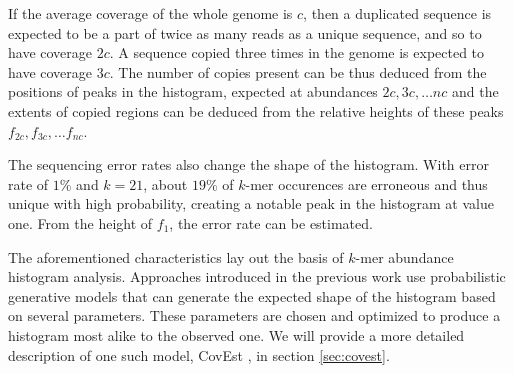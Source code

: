 \medskip

If the average coverage of the whole genome is $c$, then a duplicated sequence is expected 
to be a part of twice as many reads as a unique sequence, and so to have coverage $2c$. 
A sequence copied three times in the genome is expected to have coverage $3c$.
The number of copies present can be thus deduced from the positions of peaks in the histogram,
expected at abundances $2c, 3c, \dots nc$ and the extents of copied regions can be deduced
from the relative heights of these peaks $f_{2c}, f_{3c}, \dots f_{nc}$.

\medskip
 
The sequencing error rates also change the shape of the histogram. With error rate of $1\%$ 
and $k=21$, about $19\%$ of $k$-mer occurences are erroneous and thus unique with high probability, 
creating a notable peak in the histogram at value one. From the height of $f_1$, the error rate
can be estimated.

\medskip

The aforementioned characteristics lay out the basis of $k$-mer abundance histogram analysis.
Approaches introduced in the previous work \cite{Hozza2015, Williams2013, Melsted2014,
Sivadasan2016} use probabilistic generative models that can generate the
expected shape of the histogram based on several parameters. These parameters are chosen
and optimized to produce a histogram most alike to the observed one.
We will provide a more detailed description of one such model, CovEst \cite{Hozza2015, Hozza2016},
in section \ref{sec:covest}.
